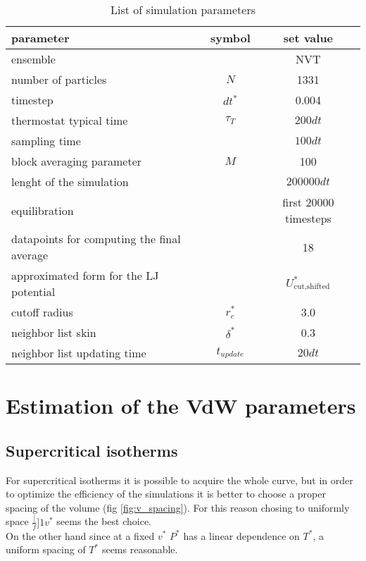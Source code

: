 \documentclass[a4paper, 11pt]{article}
\begin{document}
    \begin{table}[H]
      \centering
      \begin{tabular}{lcc}
        \toprule
        parameter & symbol & set value \\
        \midrule
        ensemble & & NVT \\
        number of particles & $N$ & 1331 \\
        timestep & $dt^*$ & 0.004 \\
        thermostat typical time & $\tau_T$ & $200 dt$ \\
        sampling time & & $100 dt$ \\
        block averaging parameter & $M$ & 100 \\
        lenght of the simulation & & $200000 dt$ \\
        equilibration & & first 20000 timesteps \\
        datapoints for computing the final average & & 18 \\
        approximated form for the LJ potential & & $U_{\text{cut,shifted}}^*$ \\
        cutoff radius & $r_c^*$ & 3.0 \\
        neighbor list skin & $\delta^*$ & 0.3 \\
        neighbor list updating time & $t_{update}$ & $20 dt$ \\
        \bottomrule
      \end{tabular}
      \caption{List of simulation parameters}
      \label{tab:parlist}
    \end{table}



\section{Estimation of the VdW parameters}
  \subsection{Supercritical isotherms}
    For supercritical isotherms it is possible to acquire the whole curve, but in order to optimize the efficiency of the simulations it is better to choose a proper spacing of the volume (fig \ref{fig:v_spacing}). For this reason chosing to uniformly space $\frac[f]{1}{v^*}$ seems the best choice. \\
    On the other hand since at a fixed $v^*$ $P^*$ has a linear dependence on $T^*$, a uniform spacing of $T^*$ seems reasonable.
\end{document}
